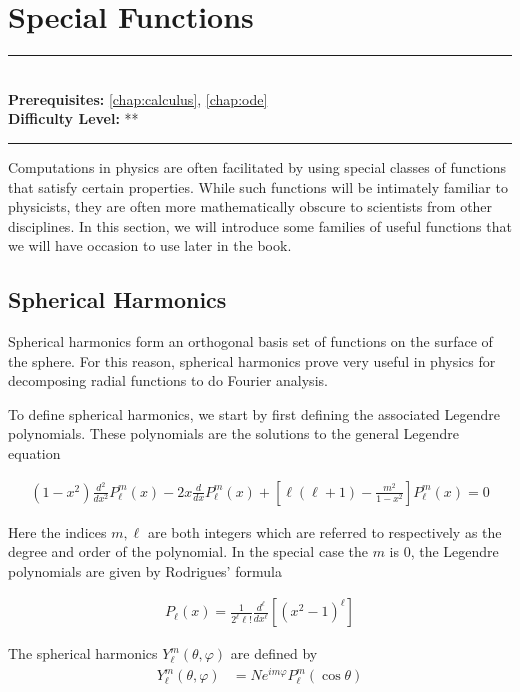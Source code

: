 \documentclass[book.tex]{subfiles}
\begin{document}
\chapter{Special Functions}
\label{chap:special_funcntions}
\noindent\rule{11cm}{0.4pt} \\
\textbf{Prerequisites:} \autoref{chap:calculus}, \autoref{chap:ode} \\
\textbf{Difficulty Level:} ** \\
\noindent\rule{11cm}{0.4pt}
\vspace{5mm}

Computations in physics are often facilitated by using special classes of functions that satisfy certain properties. While such functions will be intimately familiar to physicists, they are often more mathematically obscure to scientists from other disciplines. In this section, we will introduce some families of useful functions that we will have occasion to use later in the book.

\section{Spherical Harmonics}

Spherical harmonics form an orthogonal basis set of functions on the surface of the sphere. For this reason, spherical harmonics prove very useful in physics for decomposing radial functions to do Fourier analysis.

To define spherical harmonics, we start by first defining the associated Legendre polynomials. These polynomials are the solutions to the general Legendre equation

\begin{align}
(1 - x^2)\frac{d^2}{dx^2}P^m_{\ell}(x) - 2x\frac{d}{dx}P^m_{\ell}(x) + \left [\ell(\ell + 1) - \frac{m^2}{1-x^2} \right] P^m_{\ell}(x) = 0
\end{align}

Here the indices $m, \ell$ are both integers which are referred to respectively as the degree and order of the polynomial. In the special case the $m$ is $0$, the Legendre polynomials are given by Rodrigues' formula

\begin{align}
P_{\ell}(x) = \frac{1}{2^{\ell}\ell!}\frac{d^{\ell}}{dx^{\ell}} [(x^2 - 1)^{\ell}]
\end{align}


The spherical harmonics $Y^m_{\ell}(\theta, \varphi)$ are defined by
\begin{align}
Y^m_{\ell}(\theta, \varphi) &= N e^{im \varphi} P^m_{\ell}(\cos \theta)
\end{align}
\end{document}
